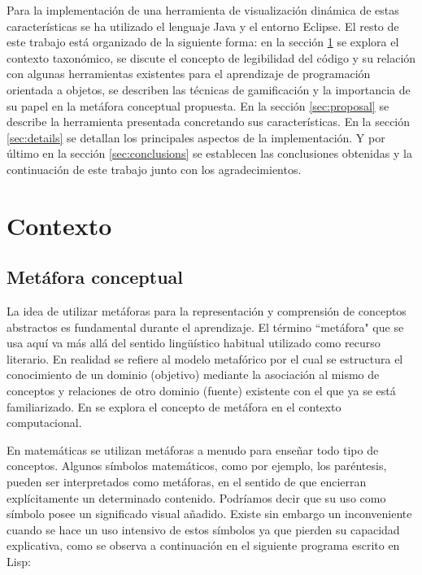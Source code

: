 \documentclass{llncs}
\begin{document}
Para la implementación de una herramienta de visualización dinámica de estas características se ha utilizado el lenguaje Java y el entorno Eclipse. El resto de este trabajo está organizado de la siguiente forma: en la sección \ref{sec:background} se explora el contexto taxonómico, se discute el concepto de legibilidad del código y su relación con algunas herramientas existentes para el aprendizaje de programación orientada a objetos, se describen las técnicas de gamificación y la importancia de su papel en la metáfora conceptual propuesta. En la sección \ref{sec:proposal} se describe la herramienta presentada concretando sus características. En la sección \ref{sec:details} se detallan los principales aspectos de la implementación. Y por último en la sección \ref{sec:conclusions} se establecen las conclusiones obtenidas y la continuación de este trabajo junto con los agradecimientos. 

%
%
\section{Contexto}
\label{sec:background}
\subsection{Metáfora conceptual}

La idea de utilizar metáforas para la representación y comprensión de conceptos abstractos es fundamental durante el aprendizaje. El término ``metáfora" que se usa aquí va más allá del sentido lingüístico habitual utilizado como recurso literario. En realidad se refiere al modelo metafórico por el cual se estructura el conocimiento de un dominio (objetivo) mediante la asociación al mismo de conceptos y relaciones de otro dominio (fuente) existente con el que ya se está familiarizado. En \cite{travers1996programming} se explora el concepto de metáfora en el contexto computacional.

En matemáticas se utilizan metáforas a menudo para enseñar todo tipo de conceptos. Algunos símbolos matemáticos, como por ejemplo, los paréntesis, pueden ser interpretados como metáforas, en el sentido de que encierran explícitamente un determinado contenido. Podríamos decir que su uso como símbolo posee un significado visual añadido. Existe sin embargo un inconveniente cuando se hace un uso intensivo de estos símbolos ya que pierden su capacidad explicativa, como se observa a continuación en el siguiente programa escrito en Lisp:
\end{document}
